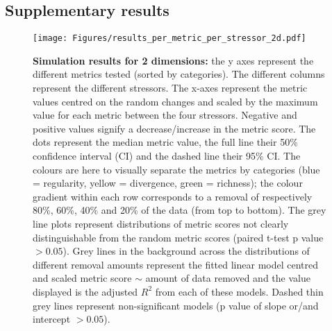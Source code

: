 \documentclass[12pt,letterpaper]{article}
\begin{document}
\subsection{Supplementary results}

\begin{figure}[!htbp]
\centering
   \texttt{[image: Figures/results\_per\_metric\_per\_stressor\_2d.pdf]}
\caption{\scriptsize{\textbf{Simulation results for 2 dimensions:} the y axes represent the different metrics tested (sorted by categories).
The different columns represent the different stressors. The x-axes represent the metric values centred on the random changes and scaled by the maximum value for each metric between the four stressors.
Negative and positive values signify a decrease/increase in the metric score.
The dots represent the median metric value, the full line their 50\% confidence interval (CI) and the dashed line their 95\% CI.
The colours are here to visually separate the metrics by categories (blue = regularity, yellow = divergence, green = richness); the colour gradient within each row corresponds to a removal of respectively 80\%, 60\%, 40\% and 20\% of the data (from top to bottom).
The grey line plots represent distributions of metric scores not clearly distinguishable from the random metric scores (paired t-test p value $> 0.05$).
Grey lines in the background across the distributions of different removal amounts represent the fitted linear model centred and scaled metric score $\sim$ amount of data removed and the value displayed is the adjusted $R^2$ from each of these models.
Dashed thin grey lines represent non-significant models (p value of slope or/and intercept $> 0.05$).
}}
\label{Fig:simulation_results}
\end{figure}
\bigskip
\end{document}
